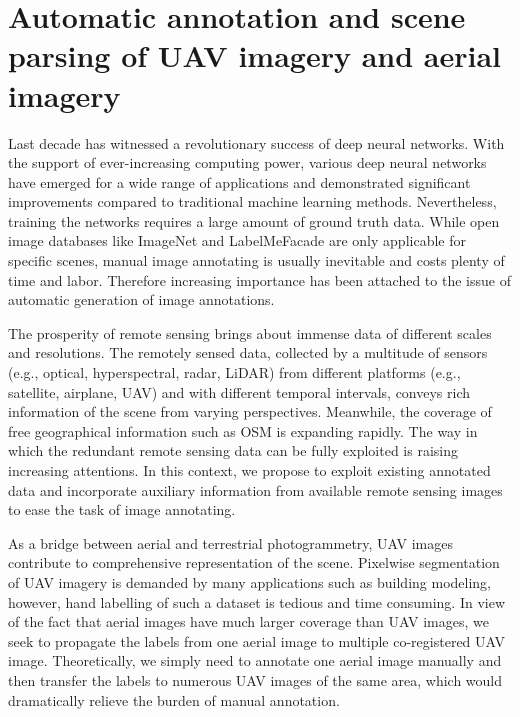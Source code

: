 \chapter{Automatic annotation and scene parsing of UAV imagery and aerial imagery}
\label{ch:seg}
Last decade has witnessed a revolutionary success of deep neural networks. With the support of ever-increasing computing power, various deep neural networks have emerged for a wide range of applications and demonstrated significant improvements compared to traditional machine learning methods. Nevertheless, training the networks requires a large amount of ground truth data. While open image databases like ImageNet\cite{Russakovsky2015} and LabelMeFacade\cite{Russell2008} are only applicable for specific scenes, manual image annotating is usually inevitable and costs plenty of time and labor. Therefore increasing importance has been attached to the issue of automatic generation of image annotations. 

The prosperity of remote sensing brings about immense data of different scales and resolutions. The remotely sensed data, collected by a multitude of sensors (e.g., optical, hyperspectral, radar, LiDAR) from different platforms (e.g., satellite, airplane, UAV) and with different temporal intervals, conveys rich information of the scene from varying perspectives. Meanwhile, the coverage of free geographical information such as OSM is expanding rapidly. The way in which the redundant remote sensing data can be fully exploited is raising increasing attentions. In this context, we propose to exploit existing annotated data and incorporate auxiliary information from available remote sensing images to ease the task of image annotating. 

As a bridge between aerial and terrestrial photogrammetry, UAV images contribute to comprehensive representation of the scene. Pixelwise segmentation of UAV imagery is demanded by many applications such as building modeling, however, hand labelling of such a dataset is tedious and time consuming. In view of the fact that aerial images have much larger coverage than UAV images, we seek to propagate the labels from one aerial image to multiple co-registered UAV image. Theoretically, we simply need to annotate one aerial image manually and then transfer the labels to numerous UAV images of the same area, which would dramatically relieve the burden of manual annotation. 

